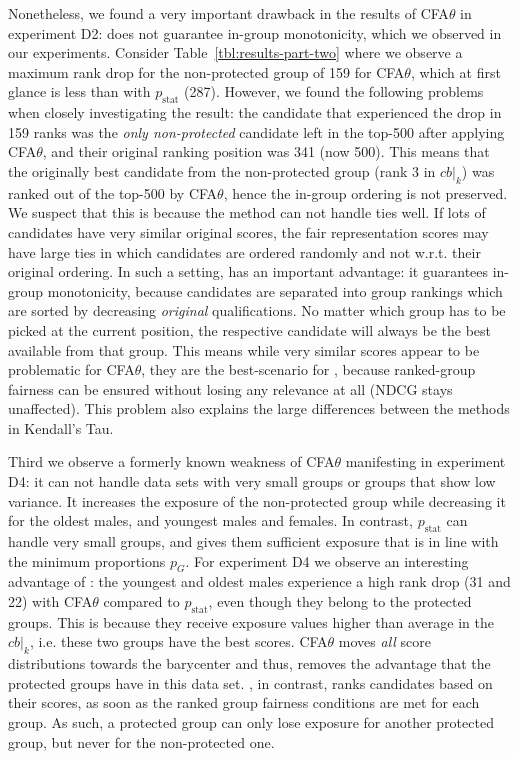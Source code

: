 %
Nonetheless, we found a very important drawback in the results of CFA$\theta$ in experiment D2: \citet{zehlike2020matching} does not guarantee in-group monotonicity, which we observed in our experiments.
%
Consider Table~\ref{tbl:results-part-two} where we observe a maximum rank drop for the non-protected group of 159 for CFA$\theta$, which at first glance is less than \algoFAIR with $p_{\text{stat}}$ (287).
%
However, we found the following problems when closely investigating the result: the candidate that experienced the drop in 159 ranks was the \emph{only non-protected} candidate left in the top-500 after applying CFA$\theta$, and their original ranking position was 341 (now 500).
%
This means that the originally best candidate from the non-protected group (rank 3 in $cb|_k$) was ranked out of the top-500 by CFA$\theta$, hence the in-group ordering is not preserved.
%
We suspect that this is because the method can not handle ties well.
%
If lots of candidates have very similar original scores, the fair representation scores may have large ties in which candidates are ordered randomly and not w.r.t. their original ordering.
%
In such a setting, \algoFAIR has an important advantage: it guarantees in-group monotonicity, because candidates are separated into group rankings which are sorted by decreasing \emph{original} qualifications.
%
No matter which group has to be picked at the current position, the respective candidate will always be the best available from that group.
%
This means while very similar scores appear to be problematic for CFA$\theta$, they are the best-scenario for \algoFAIR, because ranked-group fairness can be ensured without losing any relevance at all (NDCG stays unaffected).
%
This problem also explains the large differences between the methods in Kendall's Tau.

Third we observe a formerly known weakness of CFA$\theta$ manifesting in experiment D4: it can not handle data sets with very small groups or groups that show low variance.
%
It increases the exposure of the non-protected group while decreasing it for the oldest males, and youngest males and females.
%
In contrast, \algoFAIR $p_{\text{stat}}$ can handle very small groups, and gives them sufficient exposure that is in line with the minimum proportions $p_G$.
%
For experiment D4 we observe an interesting advantage of \algoFAIR: the youngest and oldest males experience a high rank drop (31 and 22) with CFA$\theta$ compared to \algoFAIR $p_{\text{stat}}$, even though they belong to the protected groups.
%
This is because they receive exposure values higher than average in the $cb|_k$, i.e. these two groups have the best scores.
%
CFA$\theta$ moves \emph{all} score distributions towards the barycenter and thus, removes the advantage that the protected groups have in this data set.
%
\algoFAIR, in contrast, ranks candidates based on their scores, as soon as the ranked group fairness conditions are met for each group.
%
As such, a protected group can only lose exposure for another protected group, but never for the non-protected one.


